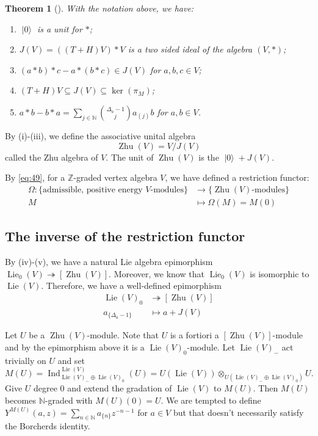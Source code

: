 \documentclass[a4paper, 12pt, reqno]{amsart}
\newtheorem{theorem}{Theorem}[subsection]
\theoremstyle{remark}
\numberwithin{equation}{subsection}
\DeclareMathOperator{\Ind}{Ind}
\DeclareMathOperator{\vac}{|0\rangle}
\DeclareMathOperator{\Lie}{Lie}
\DeclareMathOperator{\Zhu}{Zhu}
\begin{document}
\begin{theorem}[{\cite[\S 2]{de_sole_finite_2006}}]
  \label{thr:37}
  With the notation above, we have:
  \begin{enumerate}
  \item $\vac$ is a unit for $*$;
  \item $J(V) = ((T + H)V)*V$ is a two sided ideal of the algebra $(V, *)$;
  \item $(a*b)*c - a*(b*c) \in J(V)$ for $a, b, c \in V$;
  \item $(T + H)V \subseteq J(V) \subseteq \ker(\pi_M)$;
  \item $a*b - b*a = \sum_{j \in \mathbb{N}}\binom{\Delta_a - 1}{j}a_{(j)}b$ for $a, b \in V$.
  \end{enumerate}
\end{theorem}

By (i)-(iii), we define the associative unital algebra
\begin{equation*}
  \Zhu(V) = V/J(V)
\end{equation*}
called the Zhu algebra of $V$.
The unit of $\Zhu(V)$ is the $\vac + J(V)$.

By \eqref{eq:49}, for a $\mathbb{Z}$-graded vertex algebra $V$, we have defined a restriction functor:
\begin{align*}
  \Omega: \{\text{admissible, positive energy $V$-modules}\} &\to \{\text{$\Zhu(V)$-modules}\} \\
  M & \mapsto \Omega(M) = M(0)
\end{align*}

\subsection{The inverse of the restriction functor}
\label{sec:inverse-restr-funct}

By (iv)-(v), we have a natural Lie algebra epimorphism $\Lie_0(V) \twoheadrightarrow [\Zhu(V)]$.
Moreover, we know that $\Lie_0(V)$ is isomorphic to $\Lie(V)$.
Therefore, we have a well-defined epimorphism
\begin{align*}
  \Lie(V)_0 &\twoheadrightarrow [\Zhu(V)] \\
  a_{\{\Delta_a - 1\}} &\mapsto a + J(V)
\end{align*}

Let $U$ be a $\Zhu(V)$-module.
Note that $U$ is a fortiori a $[\Zhu(V)]$-module and by the epimorphism above it is a $\Lie(V)_0$-module.
Let $\Lie(V)_-$ act trivially on $U$ and set
\begin{equation*}
  M(U) = \Ind^{\Lie(V)}_{\Lie(V)_- \oplus \Lie(V)_0}(U) = U(\Lie(V)) \otimes_{U(\Lie(V)_- \oplus \Lie(V)_0)}U.
\end{equation*}
Give $U$ degree $0$ and extend the gradation of $\Lie(V)$ to $M(U)$.
Then $M(U)$ becomes $\mathbb{N}$-graded with $M(U)(0) = U$.
We are tempted to define $Y^{M(U)}(a, z) = \sum_{n \in \mathbb{N}}a_{\{n\}}z^{-n - 1}$ for $a \in V$ but that doesn't necessarily satisfy the Borcherds identity.
\end{document}
